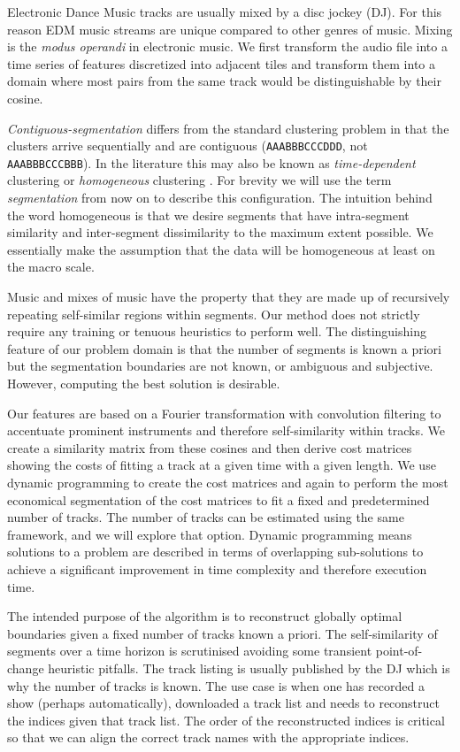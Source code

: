\documentclass[twocolumn]{article}
\begin{document}
	Electronic Dance Music tracks are usually mixed by a disc jockey (DJ). For this reason EDM music streams are unique compared to other genres of music. Mixing is the \textit{modus operandi} in electronic music. We first transform the audio file into a time series of features discretized into adjacent tiles and transform them into a domain where most pairs from the same track would be distinguishable by their cosine. 
	
	\textit{Contiguous-segmentation} differs from the standard clustering problem in that the clusters arrive sequentially and are contiguous (\texttt{AAABBBCCCDDD}, not \texttt{AAABBBCCCBBB}). In the literature this may also be known as \textit{time-dependent} clustering or \textit{homogeneous} clustering \citep{radu}. For brevity we will use the term \textit{segmentation} from now on to describe this configuration. The intuition behind the word homogeneous is that we desire segments that have intra-segment similarity and inter-segment dissimilarity to the maximum extent possible. We essentially make the assumption that the data will be homogeneous at least on the macro scale.
	
	Music and mixes of music have the property that they are made up of recursively repeating self-similar regions within segments. Our method does not strictly require any training or tenuous heuristics to perform well. The distinguishing feature of our problem domain is that the number of segments is known a priori but the segmentation boundaries are not known, or ambiguous and subjective. However, computing the best solution is desirable.
	
	Our features are based on a Fourier transformation with convolution filtering to accentuate prominent instruments and therefore self-similarity within tracks. We create a similarity matrix from these cosines and then derive cost matrices showing the costs of fitting a track at a given time with a given length. We use dynamic programming to create the cost matrices and again to perform the most economical segmentation of the cost matrices to fit a fixed and predetermined number of tracks. The number of tracks can be estimated using the same framework, and we will explore that option. Dynamic programming means solutions to a problem are described in terms of overlapping sub-solutions to achieve a significant improvement in time complexity and therefore execution time. 
	
	The intended purpose of the algorithm is to reconstruct globally optimal boundaries given a fixed number of tracks known a priori. The self-similarity of segments over a time horizon is scrutinised avoiding some transient point-of-change heuristic pitfalls. The track listing is usually published by the DJ which is why the number of tracks is known. The use case is when one has recorded a show (perhaps automatically), downloaded a track list and needs to reconstruct the indices given that track list. The order of the reconstructed indices is critical so that we can align the correct track names with the appropriate indices. 
	
\end{document}
